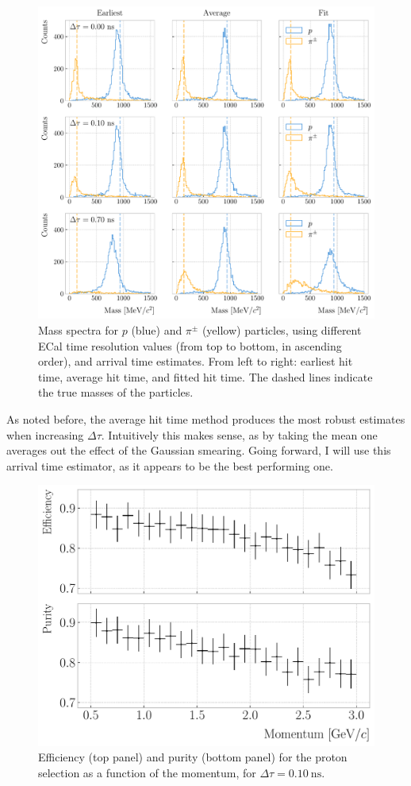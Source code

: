 \begin{figure}[t]
	\centering
	\includegraphics[width=.95\linewidth]{Images/GArSoft_PID/tof/reco_mass_comparison.pdf}
	\caption{Mass spectra for $p$ (blue) and $\pi^{\pm}$ (yellow) particles, using different ECal time resolution values (from top to bottom, in ascending order), and arrival time estimates. From left to right: earliest hit time, average hit time, and fitted hit time. The dashed lines indicate the true masses of the particles.}
	\label{fig:tof_mass_spectra}
\end{figure}

As noted before, the average hit time method produces the most robust estimates when increasing $\Delta \tau$. Intuitively this makes sense, as by taking the mean one averages out the effect of the Gaussian smearing. Going forward, I will use this arrival time estimator, as it appears to be the best performing one.

\begin{figure}[t]
	\centering
	\includegraphics[width=.75\linewidth]{Images/GArSoft_PID/tof/proton_selection_beta_metrics.pdf}
	\caption{Efficiency (top panel) and purity (bottom panel) for the proton selection as a function of the momentum, for $\Delta \tau = 0.10 ~ \mathrm{ns}$.}
	\label{fig:tof_beta_selection}
\end{figure}

